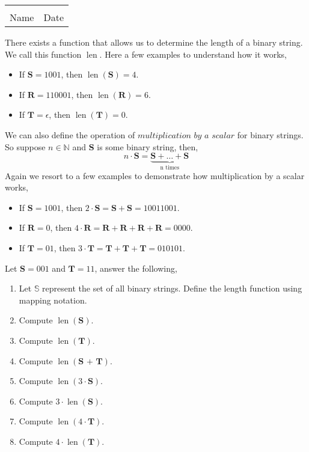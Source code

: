 \documentclass[12pt]{article} %
\begin{document}
	\begin{center}
	\noindent\begin{tabular}{ll}
		\makebox[3in]{\hrulefill} & \makebox[3in]{\hrulefill}\\
		Name & Date\\[8ex]%
	\end{tabular}
	\end{center}
	\newpage



\begin{qstn}
  There exists a function that allows us to determine the length of a binary string.\\We call
  this function $\operatorname{len}$. Here a few examples to understand how it works,
  \begin{itemize}
    \item If $\textbf{S} = 1001$, then $\operatorname{len}(\textbf{S}) = 4$.
    \item If $\textbf{R} = 110001$, then $\operatorname{len}(\textbf{R}) = 6$.
    \item If $\textbf{T} = \epsilon$, then $\operatorname{len}(\textbf{T}) = 0$.
  \end{itemize}

  We can also define the operation of $ \textit{multiplication by a scalar}$ for binary strings. So suppose $n \in
  \mathbb N$ and \textbf{S} is some binary string, then,
    \[
      n\cdot \textbf{S} = \underbrace{\textbf{S} + \dots + \textbf{S}}_{\text{n times}}
    \]
  Again we resort to a few examples to demonstrate how multiplication by a scalar works,
  \begin{itemize}
    \item If $\textbf{S} = 1001$,  then $2\cdot\textbf{S} = \textbf{S} + \textbf{S} = 10011001$.
    \item If $\textbf{R} = 0$,  then $4\cdot\textbf{R} = \textbf{R} + \textbf{R} + \textbf{R} + \textbf{R} = 0000$.
    \item If $\textbf{T} = 01$,  then $3\cdot\textbf{T} = \textbf{T} + \textbf{T} + \textbf{T} = 010101$.
  \end{itemize}
  
Let $\textbf{S} = 001$ and $\textbf{T} = 11$, answer the following,
  \begin{enumerate}[label=(\alph*)]
    \item Let $\mathbb S$ represent the set of all binary strings. Define the length function using mapping
      notation.
    \item Compute $ \operatorname{len}(\textbf{S})$.
    \item Compute $ \operatorname{len}(\textbf{T})$.
    \item Compute $ \operatorname{len}(\textbf{S + T})$.
    \item Compute $ \operatorname{len}(3\cdot\textbf{S})$.
    \item Compute $ 3\cdot \operatorname{len}(\textbf{S})$.
    \item Compute $ \operatorname{len}(4\cdot\textbf{T})$.
    \item Compute $ 4\cdot \operatorname{len}(\textbf{T})$.
  \end{enumerate}


\end{qstn}
\end{document}
